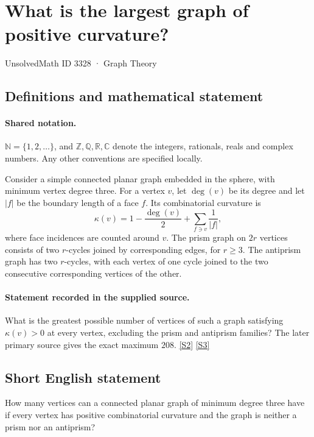 \documentclass[11pt]{article}
\newcommand{\sref}[2]{\hyperlink{source:#1:#2}{[S#2]}}
\begin{document}
\setcounter{section}{3327}
\section{What is the largest graph of positive curvature?}\label{3328}
{\small\sffamily UnsolvedMath ID 3328 · Graph Theory}
\subsection{Definitions and mathematical statement}

\paragraph{Shared notation.}$\mathbb N=\{1,2,\ldots\}$, and $\mathbb Z,\mathbb Q,\mathbb R,\mathbb C$ denote the integers, rationals, reals and complex numbers. Any other conventions are specified locally.


Consider a simple connected planar graph embedded in the sphere, with minimum vertex degree three. For a vertex $v$, let $\deg(v)$ be its degree and let $|f|$ be the boundary length of a face $f$. Its combinatorial curvature is\[ \kappa(v)=1-\frac{\deg(v)}2+\sum_{f\ni v}\frac1{|f|}, \] where face incidences are counted around $v$. The prism graph on $2r$ vertices consists of two $r$-cycles joined by corresponding edges, for $r\geq3$. The antiprism graph has two $r$-cycles, with each vertex of one cycle joined to the two consecutive corresponding vertices of the other.
\paragraph{Statement recorded in the supplied source.}
What is the greatest possible number of vertices of such a graph satisfying $\kappa(v)>0$ at every vertex, excluding the prism and antiprism families? The later primary source gives the exact maximum $208$. \sref{3328}{2} \sref{3328}{3}
\subsection{Short English statement}
How many vertices can a connected planar graph of minimum degree three have if every vertex has positive combinatorial curvature and the graph is neither a prism nor an antiprism?
\end{document}
